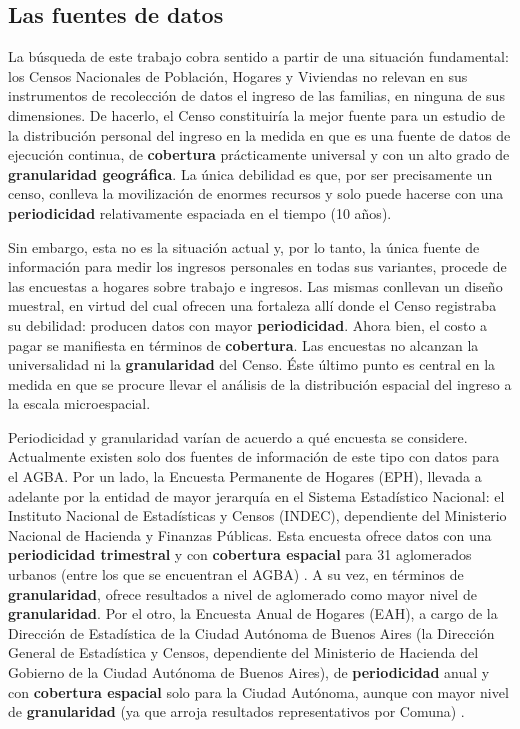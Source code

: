 	\subsection{Las fuentes de datos}
	
La búsqueda de este trabajo cobra sentido a partir de una situación fundamental: los Censos Nacionales de Población, Hogares y Viviendas no relevan en sus instrumentos de recolección de datos el ingreso de las familias, en ninguna de sus dimensiones. De hacerlo, el Censo constituiría la mejor fuente para un estudio de la distribución personal del ingreso en la medida en que es una fuente de datos de ejecución continua, de \textbf{cobertura} prácticamente universal y con un alto grado de \textbf{granularidad geográfica}. La única debilidad es que, por ser precisamente un censo, conlleva la movilización de enormes recursos y solo puede hacerse con una \textbf{periodicidad} relativamente espaciada en el tiempo (10 años). 

Sin embargo, esta no es la situación actual y, por lo tanto, la única fuente de información para medir los ingresos personales en todas sus variantes, procede de las encuestas a hogares sobre trabajo e ingresos. Las mismas conllevan un diseño muestral, en virtud del cual ofrecen una fortaleza allí donde el Censo registraba su debilidad: producen datos con mayor \textbf{periodicidad}. Ahora bien, el costo a pagar se manifiesta en términos de \textbf{cobertura}. Las encuestas no alcanzan la universalidad ni la \textbf{granularidad} del Censo. Éste último punto es central en la medida en que se procure llevar el análisis de la distribución espacial del ingreso a la escala microespacial. 

Periodicidad y granularidad varían de acuerdo a qué encuesta se considere. Actualmente existen solo dos fuentes de información de este tipo con datos para el AGBA. Por un lado, la Encuesta Permanente de Hogares (EPH), llevada a adelante por la entidad de mayor jerarquía en el Sistema Estadístico Nacional: el Instituto Nacional de Estadísticas y Censos (INDEC), dependiente del Ministerio Nacional de Hacienda y Finanzas Públicas. Esta encuesta ofrece datos con una \textbf{periodicidad trimestral} y con \textbf{cobertura espacial} para 31 aglomerados urbanos (entre los que se encuentran el AGBA) \cite{indec2003f}. A su vez, en términos de \textbf{granularidad}, ofrece resultados a nivel de aglomerado como mayor nivel de \textbf{granularidad}. Por el otro, la Encuesta Anual de Hogares (EAH), a cargo de la Dirección de Estadística de la Ciudad Autónoma de Buenos Aires (la Dirección General de Estadística y Censos, dependiente del Ministerio de Hacienda del Gobierno de la Ciudad Autónoma de Buenos Aires), de \textbf{periodicidad} anual y con \textbf{cobertura espacial} solo para la Ciudad Autónoma, aunque con mayor nivel de \textbf{granularidad} (ya que arroja resultados representativos por Comuna) \cite{eah}.

